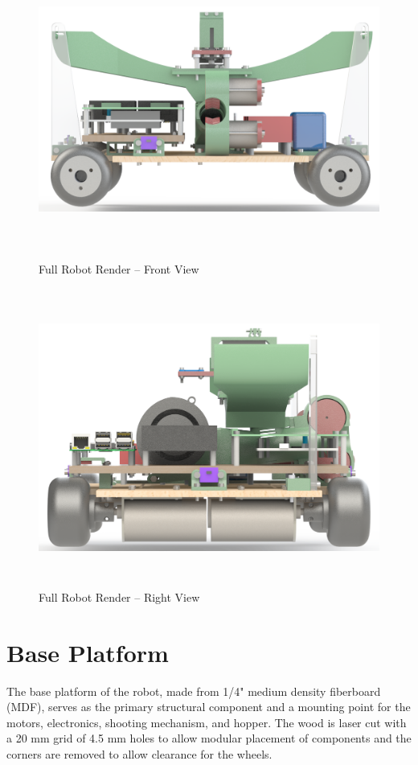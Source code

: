 \begin{figure}[H]   %
	\centering \includegraphics[width=6in, height=3.85in, keepaspectratio]{figures/render_front.png}
	\caption{Full Robot Render -- Front View}	\label{fig:render_front}
\end{figure}
\begin{figure}[H]   %
	\centering \includegraphics[width=6in, height=3.85in, keepaspectratio]{figures/render_right.png}
	\caption{Full Robot Render -- Right View}	\label{fig:render_right}
\end{figure}

\section{Base Platform}
The base platform of the robot, made from 1/4" medium density fiberboard (MDF), serves as the primary structural component and a mounting point for the motors, electronics, shooting mechanism, and hopper. The wood is laser cut with a 20 mm grid of 4.5 mm holes to allow modular placement of components and the corners are removed to allow clearance for the wheels. 

